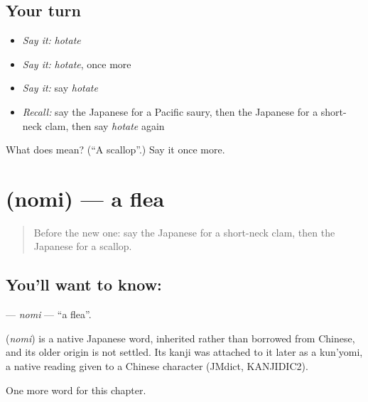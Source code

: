 \subsection*{Your turn}
\begin{itemize}
\raggedright
  \item \emph{Say it:} \emph{hotate}
  \item \emph{Say it:} \emph{hotate}, once more
  \item \emph{Say it:} say \emph{hotate}
  \item \emph{Recall:} say the Japanese for a Pacific saury, then the Japanese for a short-neck clam, then say \emph{hotate} again
\end{itemize}

\begin{tcolorbox}[breakable,colback=teal!4,colframe=teal!35!black,title={Before you move on}]
What does  mean? (\textquotedblleft{}A scallop\textquotedblright{}.) Say it once more.
\end{tcolorbox}
\section[\texorpdfstring{\ja{のみ} (nomi)}{のみ (nomi)}]{ (nomi) — a flea}

\label{lesson:JA-C117-nomi}



\begin{quote}
Before the new one: say the Japanese for a short-neck clam, then the Japanese for a scallop.
\end{quote}

\subsection*{You'll want to know: }
\textbf{} — \emph{nomi} — \textquotedblleft{}a flea\textquotedblright{}.

\begin{cousinweb}
\textbf{} (\emph{nomi}) is a native Japanese word, inherited rather than borrowed from Chinese, and its older origin is not settled. Its kanji was attached to it later as a kun'yomi, a native reading given to a Chinese character (JMdict, KANJIDIC2).
\end{cousinweb}

\begin{grammarlens}[title={What you've built}]
One more word for this chapter.
\end{grammarlens}


